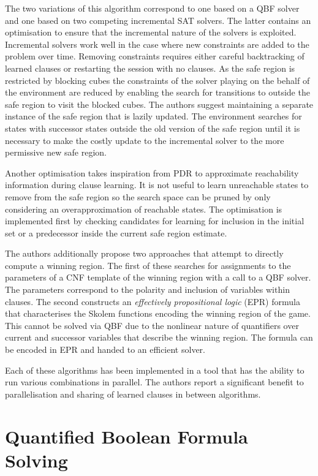 The two variations of this algorithm correspond to one based on a QBF solver and one based on two competing incremental SAT solvers. The latter contains an optimisation to ensure that the incremental nature of the solvers is exploited. Incremental solvers work well in the case where new constraints are added to the problem over time. Removing constraints requires either careful backtracking of learned clauses or restarting the session with no clauses. As the safe region is restricted by blocking cubes the constraints of the solver playing on the behalf of the environment are reduced by enabling the search for transitions to outside the safe region to visit the blocked cubes. The authors suggest maintaining a separate instance of the safe region that is lazily updated. The environment searches for states with successor states outside the old version of the safe region until it is necessary to make the costly update to the incremental solver to the more permissive new safe region.

Another optimisation takes inspiration from PDR to approximate reachability information during clause learning. It is not useful to learn unreachable states to remove from the safe region so the search space can be pruned by only considering an overapproximation of reachable states. The optimisation is implemented first by checking candidates for learning for inclusion in the initial set or a predecessor inside the current safe region estimate.

The authors additionally propose two approaches that attempt to directly compute a winning region. The first of these searches for assignments to the parameters of a CNF template of the winning region with a call to a QBF solver. The parameters correspond to the polarity and inclusion of variables within clauses. The second constructs an \emph{effectively propositional logic} (EPR) formula that characterises the Skolem functions encoding the winning region of the game. This cannot be solved via QBF due to the nonlinear nature of quantifiers over current and successor variables that describe the winning region. The formula can be encoded in EPR and handed to an efficient solver.

Each of these algorithms has been implemented in a tool that has the ability to run various combinations in parallel. The authors report a significant benefit to parallelisation and sharing of learned clauses in between algorithms.

\section{Quantified Boolean Formula Solving}

